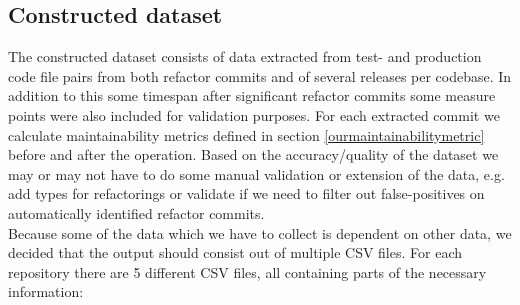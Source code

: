 \subsection{Constructed dataset}\label{constructed-dataset}
The constructed dataset consists of data extracted from test- and production code file pairs from both refactor commits and of several releases per codebase. In addition to this some timespan after significant refactor commits some measure points were also included for validation purposes. For each extracted commit we calculate maintainability metrics defined in section \ref{ourmaintainabilitymetric} before and after the operation. 
Based on the accuracy/quality of the dataset we may or may not have to do some manual validation or extension of the data, e.g. add types for refactorings or validate if we need to filter out false-positives on automatically identified refactor commits. \\ \indent
Because some of the data which we have to collect is dependent on other data, we decided that the output should consist out of multiple CSV files. For each repository there are 5 different CSV files, all containing parts of the necessary information:
